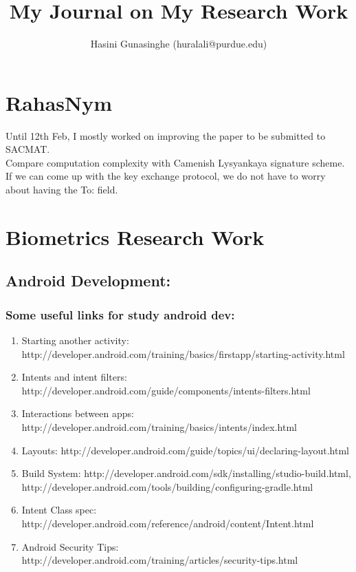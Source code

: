 \documentclass[11pt]{article}
\title{
\vspace{-20.mm}
My Journal on My Research Work}
\author{Hasini Gunasinghe (huralali@purdue.edu)}
\date{}
\begin{document}
\maketitle

\section*{RahasNym}
Until 12th Feb, I mostly worked on improving the paper to be submitted to SACMAT.\\
Compare computation complexity with Camenish Lysyankaya signature scheme.\\
If we can come up with the key exchange protocol, we do not have to worry about having the To: field.\\

\pagebreak

\section*{Biometrics Research Work}
\subsection*{Android Development:}

\subsubsection*{Some useful links for study android dev:}
\begin{enumerate}
 \item Starting another activity: http://developer.android.com/training/basics/firstapp/starting-activity.html
 \item Intents and intent filters: http://developer.android.com/guide/components/intents-filters.html
 \item Interactions between apps: http://developer.android.com/training/basics/intents/index.html
 \item Layouts: http://developer.android.com/guide/topics/ui/declaring-layout.html
 \item Build System: http://developer.android.com/sdk/installing/studio-build.html, 
http://developer.android.com/tools/building/configuring-gradle.html
 \item Intent Class spec: http://developer.android.com/reference/android/content/Intent.html
 \item Android Security Tips: http://developer.android.com/training/articles/security-tips.html
\end{enumerate}
\end{document}
